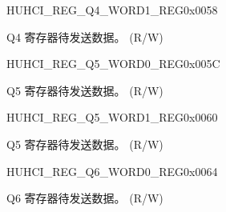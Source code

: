 \begin{register}{H}{UHCI\_REG\_Q4\_WORD1\_REG}{0x0058}\label{regdesc:UHCIREGQ4WORD1REG}
%
\regnewline%
\begin{regdesc}\begin{reglist}
\label{fielddesc:UHCISENDQ4WORD1}\item [UHCI\_SEND\_Q4\_WORD1] Q4 寄存器待发送数据。 (R/W)
\end{reglist}\end{regdesc}
\end{register}


\begin{register}{H}{UHCI\_REG\_Q5\_WORD0\_REG}{0x005C}\label{regdesc:UHCIREGQ5WORD0REG}
%
\regnewline%
\begin{regdesc}\begin{reglist}
\label{fielddesc:UHCISENDQ5WORD0}\item [UHCI\_SEND\_Q5\_WORD0] Q5 寄存器待发送数据。 (R/W)
\end{reglist}\end{regdesc}
\end{register}


\begin{register}{H}{UHCI\_REG\_Q5\_WORD1\_REG}{0x0060}\label{regdesc:UHCIREGQ5WORD1REG}
%
\regnewline%
\begin{regdesc}\begin{reglist}
\label{fielddesc:UHCISENDQ5WORD1}\item [UHCI\_SEND\_Q5\_WORD1] Q5 寄存器待发送数据。 (R/W)
\end{reglist}\end{regdesc}
\end{register}


\begin{register}{H}{UHCI\_REG\_Q6\_WORD0\_REG}{0x0064}\label{regdesc:UHCIREGQ6WORD0REG}
%
\regnewline%
\begin{regdesc}\begin{reglist}
\label{fielddesc:UHCISENDQ6WORD0}\item [UHCI\_SEND\_Q6\_WORD0] Q6 寄存器待发送数据。 (R/W)
\end{reglist}\end{regdesc}
\end{register}


